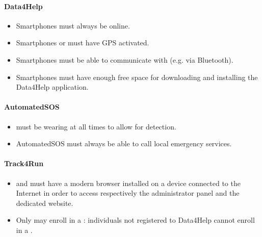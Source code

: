 \documentclass[../../rasd.tex]{subfiles}
\begin{document}
		\paragraph{Data4Help}
		 	\begin{itemize}	
		 		\item Smartphones must always be online.
		 		\item Smartphones or  must have GPS activated.
		 		\item Smartphones must be able to communicate with  (e.g. via Bluetooth).
		 		\item Smartphones must have enough free space for downloading and installing the Data4Help application.
		 	\end{itemize}
		 \paragraph{AutomatedSOS}
		 	\begin{itemize}
		 		\item {} must be wearing  at all times to allow for  detection.
		 		\item AutomatedSOS must always be able to call local emergency services.
		 	\end{itemize}
		 \paragraph{Track4Run}
		 	\begin{itemize}
		 		\item {} and  must have a modern browser installed on a device connected to the Internet in order to access respectively the  administrator panel and the  dedicated website.
		 		\item Only  may enroll in a : individuals not registered to Data4Help cannot enroll in a .
		 	\end{itemize}
\end{document}
